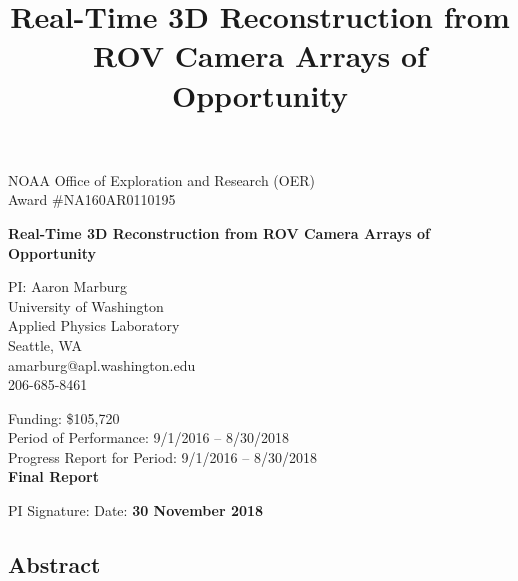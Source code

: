\documentclass[letterpaper,12pt]{article}
\title{Real-Time 3D Reconstruction from ROV Camera Arrays of Opportunity}
\begin{document}
\begin{center} 
\thispagestyle{empty}

\vfill

{\large NOAA Office of Exploration and Research (OER)\\
Award \#NA160AR0110195}

\vspace{1em}

\textbf{\Large Real-Time 3D Reconstruction from ROV Camera Arrays of Opportunity}

\vfill

PI: Aaron Marburg \\
University of Washington  \\
Applied Physics Laboratory \\
Seattle, WA \\
amarburg@apl.washington.edu \\
206-685-8461

\vfill

Funding:  \$105,720 \\
Period of Performance:  9/1/2016 -- 8/30/2018\\
Progress Report for Period:   9/1/2016 -- 8/30/2018 \\
\textbf{Final Report}

\vfill 

PI Signature:   \hspace{3in}   Date:  \textbf{30 November 2018}

%
\end{center} \clearpage
{}


\subsection*{Abstract} 
\end{document}
